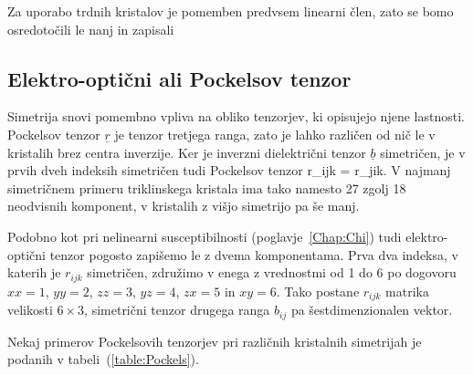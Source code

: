 Za uporabo trdnih kristalov je pomemben
predvsem linearni člen, zato se bomo osredotočili le nanj in zapisali

\subsection*{Elektro-optični ali Pockelsov tenzor}
Simetrija snovi pomembno vpliva na obliko tenzorjev, ki opisujejo njene lastnosti.
Pockelsov tenzor $\underline{r}$ je tenzor tretjega ranga, zato je lahko različen
od nič le v kristalih brez centra inverzije. 
Ker je inverzni dielektrični tenzor $\underline{b}$ simetričen, je v prvih dveh indeksih simetričen
tudi Pockelsov tenzor
\beq
r_{ijk} = r_{jik}.
\eeq
V najmanj simetričnem primeru triklinskega kristala ima tako namesto 27 zgolj 
18 neodvisnih komponent, v kristalih z višjo simetrijo pa še manj. 

Podobno kot pri nelinearni susceptibilnosti (poglavje~\ref{Chap:Chi}) 
tudi elektro-optični tenzor pogosto zapišemo le z dvema komponentama. 
Prva dva indeksa, v katerih je $r_{ijk}$ simetričen, združimo
v enega z vrednostmi od 1 do 6 po dogovoru $xx=1$, $yy=2$, $zz=3$,
$yz=4$, $zx=5$ in $xy=6$. Tako postane $r_{ijk}$ matrika velikosti
$6\times3$, simetrični tenzor drugega ranga $b_{ij}$ pa šestdimenzionalen
vektor.


Nekaj primerov Pockelsovih tenzorjev pri različnih kristalnih simetrijah
je podanih v tabeli~(\ref{table:Pockels}).

